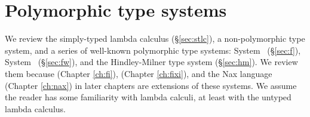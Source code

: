 \chapter{Polymorphic type systems}\label{ch:poly}
We review 
the simply-typed lambda calculus (\S\ref{sec:stlc}),
a non-polymorphic type system, and a
series of well-known polymorphic type systems:
System \F\ (\S\ref{sec:f}), System \Fw\ (\S\ref{sec:fw}),
and the Hindley-Milner type system (\S\ref{sec:hm}).
We review them because \Fi (Chapter \ref{ch:fi}), \Fixi (Chapter \ref{ch:fixi}),
and the Nax language (Chapter \ref{ch:nax}) in later chapters are
extensions of these systems. We assume the reader has some
familiarity with lambda calculi, at least with the untyped lambda calculus.


